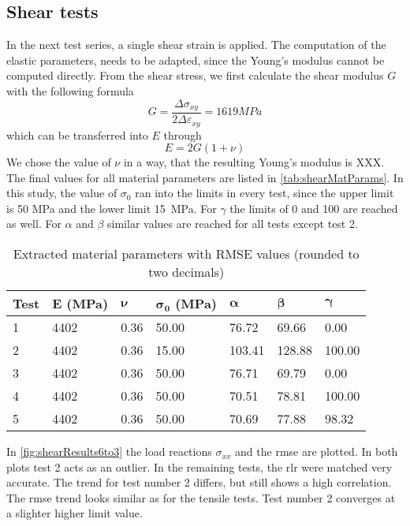 \subsection{Shear tests}
In the next test series, a single shear strain is applied. The computation of the elastic parameters, needs to be adapted, since the Young's modulus cannot be computed directly. From the shear stress, we first calculate the shear modulus $G$ with the following formula
\begin{equation}
    G = \frac{\Delta\sigma_{xy}}{2\Delta\varepsilon_{xy}} = 1619 MPa
\end{equation}
which can be transferred into $E$ through
\begin{equation}
    E = 2G(1+\nu) 
\end{equation}
We chose the value of $\nu$ in a way, that the resulting Young's modulus is XXX. The final values for all material parameters are listed in \autoref{tab:shearMatParams}. In this study, the value of $\sigma_0$ ran into the limits in every test, since the upper limit is 50 MPa and the lower limit 15 MPa. For $\gamma$ the limits of 0 and 100 are reached as well. For $\alpha$ and $\beta$ similar values are reached for all tests except test 2. 

\begin{table}[h!]
\centering
\caption{Extracted material parameters with RMSE values (rounded to two decimals)}
\label{tab:shearMatParams}
\renewcommand{\arraystretch}{1.1}
\begin{tabular}{L{0.08\textwidth}|C{0.08\textwidth}C{0.08\textwidth}C{0.08\textwidth}C{0.08\textwidth}C{0.08\textwidth}C{0.08\textwidth}}
\toprule
\textbf{Test} & \textbf{E (MPa)} & $\boldsymbol{\nu}$ & $\boldsymbol{\sigma_0}$ \textbf{(MPa)} & $\boldsymbol{\alpha}$ & $\boldsymbol{\beta}$ & $\boldsymbol{\gamma}$ \\
 & 4402 & 0.36 & 50.00 & 76.72 & 69.66 & 0.00 \\
2 & 4402 & 0.36 & 15.00 & 103.41 & 128.88 & 100.00 \\
3 & 4402 & 0.36 & 50.00 & 76.71 & 69.79 & 0.00 \\
4 & 4402 & 0.36 & 50.00 & 70.51 & 78.81 & 100.00  \\
5 & 4402 & 0.36 & 50.00 & 70.69 & 77.88 & 98.32 \\
\bottomrule
\end{tabular}
\end{table}

In \autoref{fig:shearResults6to3} the load reactions $\sigma_{xx}$ and the \acrshort{rmse} are plotted. In both plots test 2 acts as an outlier. In the remaining tests, the \acrlong{rlr} were matched very accurate. The trend for test number 2 differs, but still shows a high correlation. The \acrshort{rmse} trend looks similar as for the tensile tests. Test number 2 converges at a slighter higher limit value. 


